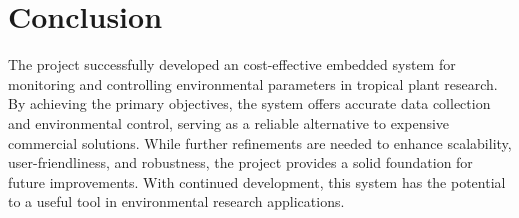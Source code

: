 \section{Conclusion}

The project successfully developed an cost-effective embedded system for monitoring and controlling environmental parameters in tropical plant research. By achieving the primary objectives, the system offers accurate data collection and environmental control, serving as a reliable alternative to expensive commercial solutions. While further refinements are needed to enhance scalability, user-friendliness, and robustness, the project provides a solid foundation for future improvements. With continued development, this system has the potential to a useful tool in environmental research applications.